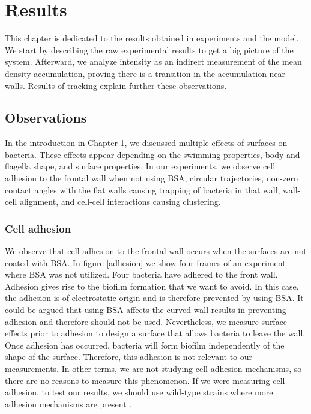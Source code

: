 \chapter{Results}

This chapter is dedicated to the results obtained in experiments and the model. We start by describing the raw experimental results to get a big picture of the system. Afterward, we analyze intensity as an indirect measurement of the mean density accumulation, proving there is a transition in the accumulation near walls. Results of tracking explain further these observations.  

\section{Observations}
\label{section: observations}

In the introduction in Chapter 1, we discussed multiple effects of surfaces on bacteria. These effects appear depending on the swimming properties, body and flagella shape, and surface properties. In our experiments, we observe cell adhesion to the frontal wall when not using BSA, circular trajectories, non-zero contact angles with the flat walls causing trapping of bacteria in that wall, wall-cell alignment, and cell-cell interactions causing clustering.

\subsection{Cell adhesion}


We observe that cell adhesion to the frontal wall occurs when the surfaces are not coated with BSA. In figure \ref{adhesion} we show four frames of an experiment where BSA was not utilized. Four bacteria have adhered to the front wall. Adhesion gives rise to the biofilm formation that we want to avoid. In this case, the adhesion is of electrostatic origin and is therefore prevented by using BSA. It could be argued that using BSA affects the curved wall results in preventing adhesion and therefore should not be used. Nevertheless, we measure surface effects prior to adhesion to design a surface that allows bacteria to leave the wall. Once adhesion has occurred, bacteria will form biofilm independently of the shape of the surface. Therefore, this adhesion is not relevant to our measurements. In other terms, we are not studying cell adhesion mechanisms, so there are no reasons to measure this phenomenon. If we were measuring cell adhesion, to test our results, we should use wild-type strains where more adhesion mechanisms are present \cite{Costerton1987BacterialDisease.}. 

